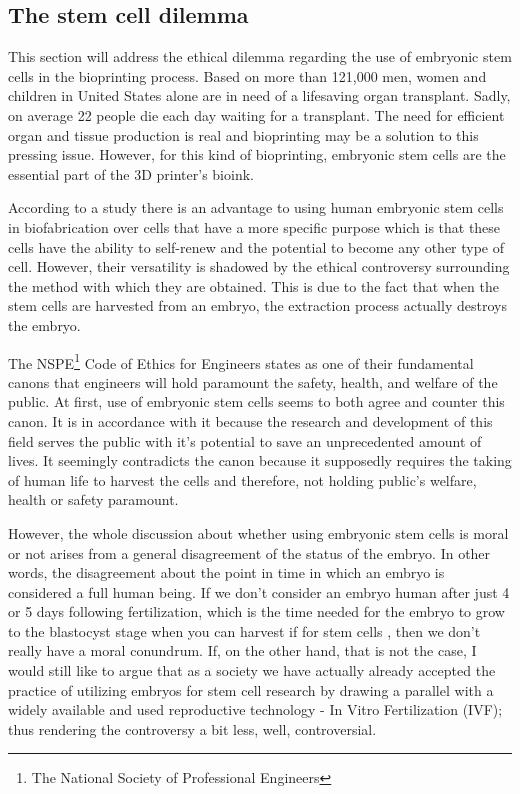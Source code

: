 \documentclass[12pt]{article} %
\begin{document}
\subsection{The stem cell dilemma} %

This section will address the ethical dilemma regarding the use of embryonic stem cells in the bioprinting process. 
Based on \cite{OPTN data as of January 2016} more than 121,000 men, women and children in United States alone are in need of a lifesaving organ transplant. Sadly, on average 22 people die each day waiting for a transplant. The need for efficient organ and tissue production is real and bioprinting may be a solution to this pressing issue. However, for this kind of bioprinting, embryonic stem cells are the essential part of the 3D printer's bioink.

According to a study \cite{Faulkner-Jones:2013} there is an advantage to using human embryonic stem cells in biofabrication over cells that have a more specific purpose which is that these cells have the ability to self-renew and the potential to become any other type of cell. However, their versatility is shadowed by the ethical controversy surrounding the method with which they are obtained. This is due to the fact that when the stem cells are harvested from an embryo, the extraction process actually destroys the embryo. 

The NSPE\footnote{The National Society of Professional Engineers} Code of Ethics for Engineers states as one of their fundamental canons that engineers will hold paramount the safety, health, and welfare of the public. At first, use of embryonic stem cells seems to both agree and counter this canon. 
It is in accordance with it because the research and development of this field serves the public with it's potential to save an unprecedented amount of lives. 
It seemingly contradicts the canon because it supposedly requires the taking of human life to harvest the cells and therefore, not holding public's welfare, health or safety paramount. 

However, the whole discussion about whether using embryonic stem cells is moral or not arises from a general disagreement of the status of the embryo. In other words, the disagreement about the point in time in which an embryo is considered a full human being. If we don't consider an embryo human after just 4 or 5 days following fertilization, which is the time needed for the embryo to grow to the blastocyst stage when you can harvest if for stem cells \cite{Landry:2016}, then we don't really have a moral conundrum. If, on the other hand, that is not the case, I would still like to argue that as a society we have actually already accepted the practice of utilizing embryos for stem cell research by drawing a parallel with a widely available and used reproductive technology - In Vitro Fertilization (IVF); thus rendering the controversy a bit less, well, controversial. 
\end{document}
